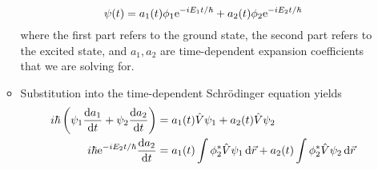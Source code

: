 \documentclass[../notes.tex]{subfiles}
\begin{document}
\begin{itemize}
\begin{itemize}
        \begin{equation*}
            \psi(t) = a_1(t)\phi_1\e[-iE_1t/\hbar]+a_2(t)\phi_2\e[-iE_2t/\hbar]
        \end{equation*}
        where the first part refers to the ground state, the second part refers to the excited state, and $a_1,a_2$ are time-dependent expansion coefficients that we are solving for.
        \item Substitution into the time-dependent Schr\"{o}dinger equation yields
        \begin{align*}
            i\hbar\left( \psi_1\dv{a_1}{t}+\psi_2\dv{a_2}{t} \right) &= a_1(t)\hat{V}\psi_1+a_2(t)\hat{V}\psi_2\\
            i\hbar\e[-iE_2t/\hbar]\dv{a_2}{t} &= a_1(t)\int\phi_2^*\hat{V}\psi_1\dd{\vec{r}}+a_2(t)\int\phi_2^*\hat{V}\psi_2\dd{\vec{r}}
        \end{align*}
    \end{itemize}
\end{itemize}
\end{document}
